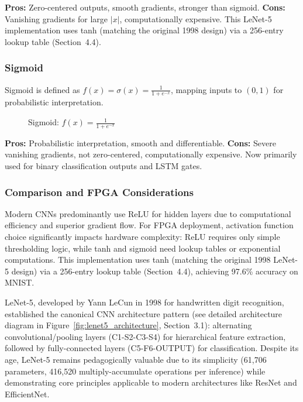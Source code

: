 \documentclass[12pt,a4paper]{report}
\begin{document}
\textbf{Pros:} Zero-centered outputs, smooth gradients, stronger than sigmoid. \textbf{Cons:} Vanishing gradients for large $|x|$, computationally expensive. This LeNet-5 implementation uses tanh (matching the original 1998 design) via a 256-entry lookup table (Section~4.4).

\subsubsection{Sigmoid}

Sigmoid is defined as $f(x) = \sigma(x) = \frac{1}{1 + e^{-x}}$, mapping inputs to $(0, 1)$ for probabilistic interpretation.

\begin{figure}[H]
\centering
{}
\caption{Sigmoid: $f(x) = \frac{1}{1 + e^{-x}}$}
\label{fig:sigmoid}
\end{figure}

\textbf{Pros:} Probabilistic interpretation, smooth and differentiable. \textbf{Cons:} Severe vanishing gradients, not zero-centered, computationally expensive. Now primarily used for binary classification outputs and LSTM gates.

\subsubsection{Comparison and FPGA Considerations}

Modern CNNs predominantly use ReLU for hidden layers due to computational efficiency and superior gradient flow. For FPGA deployment, activation function choice significantly impacts hardware complexity: ReLU requires only simple thresholding logic, while tanh and sigmoid need lookup tables or exponential computations. This implementation uses tanh (matching the original 1998 LeNet-5 design) via a 256-entry lookup table (Section~4.4), achieving 97.6\% accuracy on MNIST.

LeNet-5, developed by Yann LeCun in 1998 for handwritten digit recognition, established the canonical CNN architecture pattern (see detailed architecture diagram in Figure~\ref{fig:lenet5_architecture}, Section~3.1): alternating convolutional/pooling layers (C1-S2-C3-S4) for hierarchical feature extraction, followed by fully-connected layers (C5-F6-OUTPUT) for classification. Despite its age, LeNet-5 remains pedagogically valuable due to its simplicity (61,706 parameters, 416,520 multiply-accumulate operations per inference) while demonstrating core principles applicable to modern architectures like ResNet and EfficientNet.
\end{document}
